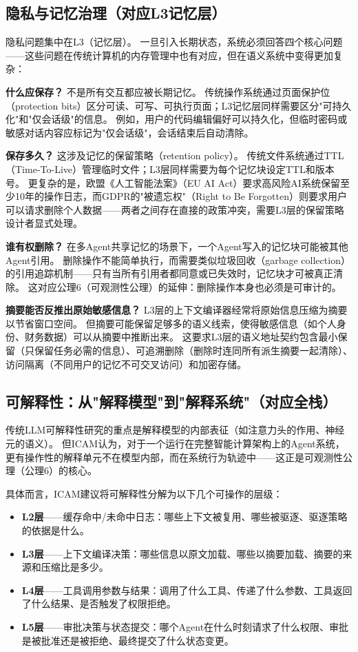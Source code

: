\subsection{隐私与记忆治理（对应L3记忆层）}

隐私问题集中在L3（记忆层）。
一旦引入长期状态，系统必须回答四个核心问题——这些问题在传统计算机的内存管理中也有对应，但在语义系统中变得更加复杂：

\textbf{什么应保存？}
不是所有交互都应被长期记忆。
传统操作系统通过页面保护位（protection bits）区分可读、可写、可执行页面；L3记忆层同样需要区分"可持久化"和"仅会话级"的信息。
例如，用户的代码编辑偏好可以持久化，但临时密码或敏感对话内容应标记为"仅会话级"，会话结束后自动清除。

\textbf{保存多久？}
这涉及记忆的保留策略（retention policy）。
传统文件系统通过TTL（Time-To-Live）管理临时文件；L3层同样需要为每个记忆块设定TTL和版本号。
更复杂的是，欧盟《人工智能法案》（EU AI Act）要求高风险AI系统保留至少10年的操作日志\cite{euaiact2026}，而GDPR的"被遗忘权"（Right to Be Forgotten）则要求用户可以请求删除个人数据\cite{gdpr_righttoforget}——两者之间存在直接的政策冲突，需要L3层的保留策略设计者显式处理。

\textbf{谁有权删除？}
在多Agent共享记忆的场景下，一个Agent写入的记忆块可能被其他Agent引用。
删除操作不能简单执行，而需要类似垃圾回收（garbage collection）的引用追踪机制——只有当所有引用者都同意或已失效时，记忆块才可被真正清除。
这对应公理6（可观测性公理）的延伸：删除操作本身也必须是可审计的。

\textbf{摘要能否反推出原始敏感信息？}
L3层的上下文编译器经常将原始信息压缩为摘要以节省窗口空间。
但摘要可能保留足够多的语义线索，使得敏感信息（如个人身份、财务数据）可以从摘要中推断出来。
这要求L3层的语义地址契约包含最小保留（只保留任务必需的信息）、可追溯删除（删除时连同所有派生摘要一起清除）、访问隔离（不同用户的记忆不可交叉访问）和加密存储\cite{longmemeval2024,navaie2025privacy}。

\subsection{可解释性：从"解释模型"到"解释系统"（对应全栈）}

传统LLM可解释性研究的重点是解释模型的内部表征（如注意力头的作用、神经元的语义）。
但ICAM认为，对于一个运行在完整智能计算架构上的Agent系统，更有操作性的解释单元不在模型内部，而在系统行为轨迹中——这正是可观测性公理（公理6）的核心。

具体而言，ICAM建议将可解释性分解为以下几个可操作的层级：

\begin{itemize}[nosep]
\item \textbf{L2层}——缓存命中/未命中日志：哪些上下文被复用、哪些被驱逐、驱逐策略的依据是什么。
\item \textbf{L3层}——上下文编译决策：哪些信息以原文加载、哪些以摘要加载、摘要的来源和压缩比是多少。
\item \textbf{L4层}——工具调用参数与结果：调用了什么工具、传递了什么参数、工具返回了什么结果、是否触发了权限拒绝。
\item \textbf{L5层}——审批决策与状态提交：哪个Agent在什么时刻请求了什么权限、审批是被批准还是被拒绝、最终提交了什么状态变更。
\end{itemize}

